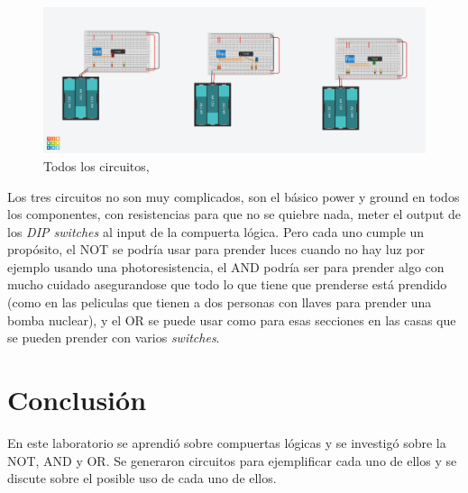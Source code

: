 \documentclass[stu, 12pt, letterpaper, donotrepeattitle, floatsintext, natbib, helv]{apa7}
\begin{document}
\begin{figure} [H]
    \centering
    \includegraphics[width=1\textwidth]{Brilliant Elzing-ROttis.png}
    \caption {Todos los circuitos, \cite{circuits}}
    \label{fig:ALL}
\end{figure}

Los tres circuitos no son muy complicados, son el básico power y ground en todos los componentes, con resistencias para que no se quiebre nada, meter el output de los \textit{DIP switches} al input de la compuerta lógica. Pero cada uno cumple un propósito, el NOT se podría usar para prender luces cuando no hay luz por ejemplo usando una photoresistencia, el AND podría ser para prender algo con mucho cuidado asegurandose que todo lo que tiene que prenderse está prendido (como en las peliculas que tienen a dos personas con llaves para prender una bomba nuclear), y el OR se puede usar como para esas secciones en las casas que se pueden prender con varios \textit{switches}.
\section*{Conclusión}
{}

En este laboratorio se aprendió sobre compuertas lógicas y se investigó sobre la NOT, AND y OR. Se generaron circuitos para ejemplificar cada uno de ellos y se discute sobre el posible uso de cada uno de ellos.

\newpage
\renewcommand\refname{\large\textbf{Referencias}}

\end{document}
